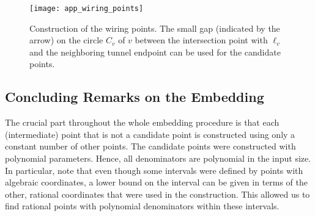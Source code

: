 \documentclass[11pt,a4paper]{article}
\begin{document}
\begin{figure}
\centering
\texttt{[image: app\_wiring\_points]}
\caption{Construction of the wiring points.
The small gap (indicated by the arrow) on the circle $C_v$ of $v$ between the intersection point with $\ell_{v}$ and the neighboring tunnel endpoint can be used for the candidate points.}
\label{fig_app_wiring_points}
\end{figure}


\subsection{Concluding Remarks on the Embedding}
The crucial part throughout the whole embedding procedure is that each (intermediate) point that is not a candidate point is constructed using only a constant number of other points.
The candidate points were constructed with polynomial parameters.
Hence, all denominators are polynomial in the input size.
In particular, note that even though some intervals were defined by points with algebraic coordinates, a lower bound on the interval can be given in terms of the other, rational coordinates that were used in the construction.
This allowed us to find rational points with polynomial denominators within these intervals.


\ifarxiv

\else

\fi

\end{document}
